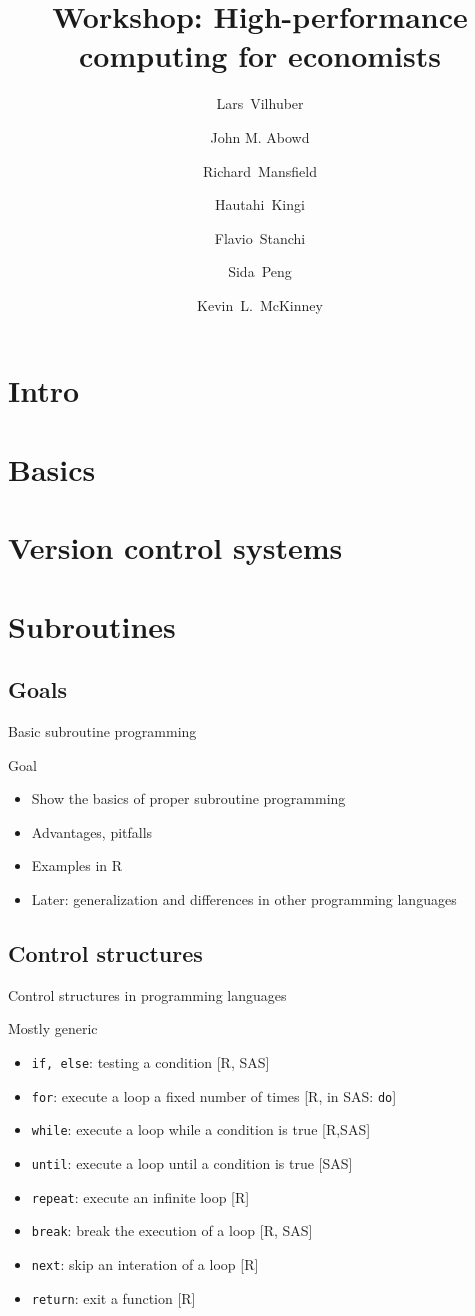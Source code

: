 \documentclass[xcolor=table,compress]{beamer}
\title[Computing for Economists]{Workshop: High-performance computing for economists}
\author[Vilhuber, Abowd, Mansfield, McKinney]{%
  Lars~Vilhuber\inst{1} \and
  John M. Abowd\inst{1} \and
  Richard~Mansfield\inst{1} \and
  Hautahi~Kingi\inst{1} \and
  Flavio~Stanchi\inst{1} \and
  Sida~Peng\inst{1} \and
  Kevin~L.~McKinney %
}
\institute[Cornell]{
  \inst{1}%
   Cornell University, Economics Department,
}%
\begin{document}
\frame{\titlepage}
\section{Intro}
\section{Basics}
\section[VCS]{Version control systems}
\section{Subroutines}

\subsection{Goals}
\begin{frame}{Basic subroutine programming}
\begin{block}{Goal}
\begin{itemize}
\item Show the basics of proper subroutine programming
\item Advantages, pitfalls
\item Examples in R
\item Later: generalization and differences in other programming languages
\end{itemize}
\end{block}
\end{frame}
\subsection[Control]{Control structures}
\begin{frame}{Control structures in programming languages}
\small
\begin{block}{Mostly generic}
\begin{itemize}
\item \texttt{if, else}: testing a condition [R, SAS] 
\item \texttt{for}: execute a loop a fixed number of times [R, in SAS: \texttt{do}]
\item \texttt{while}: execute a loop while a condition is true [R,SAS]
\item \texttt{until}: execute a loop until a condition is true [SAS]
\item \texttt{repeat}: execute an infinite loop [R]
\item \texttt{break}: break the execution of a loop [R, SAS]
\item \texttt{next}: skip an interation of a loop [R]
\item \texttt{return}: exit a function [R]
\end{itemize}
\end{block}
\end{frame}
\end{document}
